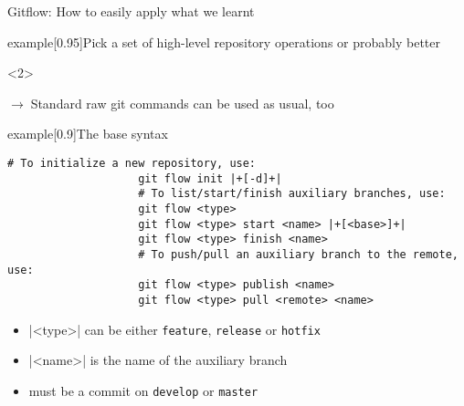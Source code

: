 \documentclass[usenames,svgnames,14pt]{beamer}
\begin{document}
\begin{frame}[fragile,c]{Gitflow: How to easily apply what we learnt}
    \vspace{-16mm}
    \begin{overlayarea}{\textwidth}{0.7\textheight}
        \begin{varblock}{example}[0.95\textwidth]{Pick a set of high-level repository operations}
            \quad or probably better \quad
        \end{varblock}
        \begin{onlyenv}<2>
            \vspace{-3mm}
            \centerline{\scriptsize \hspace{42mm}$\to\;$Standard raw git commands can be used as usual, too}
            \vspace{-6mm}
            \begin{varblock}{example}[0.9\textwidth]{The base syntax}
                \begin{lstlisting}[style=MyBash, aboveskip=2mm]
                    # To initialize a new repository, use:
                    git flow init |+[-d]+|
                    # To list/start/finish auxiliary branches, use:
                    git flow <type>
                    git flow <type> start <name> |+[<base>]+|
                    git flow <type> finish <name>
                    # To push/pull an auxiliary branch to the remote, use:
                    git flow <type> publish <name>
                    git flow <type> pull <remote> <name>
                \end{lstlisting}
                \begin{itemize}
                    \footnotesize\setlength{\itemsep}{0mm}
                    \item[] \bash|<type>|\; can be either \;\texttt{feature}, \;\texttt{release}\; or \;\texttt{hotfix}\\
                    \item[] \bash|<name>|\; is the name of the auxiliary branch\\
                    \item[] \; must be a commit on \;\texttt{develop}\; or \;\texttt{master}
                \end{itemize}
            \end{varblock}

\end{onlyenv}
\end{overlayarea}
\end{frame}
\end{document}
